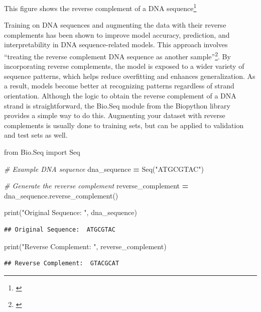 \documentclass[
]{book}
\newenvironment{Shaded}{\begin{snugshade}}{\end{snugshade}}
\newcommand{\BuiltInTok}[1]{#1}
\newcommand{\CommentTok}[1]{\textcolor[rgb]{0.56,0.35,0.01}{\textit{#1}}}
\newcommand{\ImportTok}[1]{#1}
\newcommand{\NormalTok}[1]{#1}
\newcommand{\OperatorTok}[1]{\textcolor[rgb]{0.81,0.36,0.00}{\textbf{#1}}}
\newcommand{\StringTok}[1]{\textcolor[rgb]{0.31,0.60,0.02}{#1}}
\begin{document}
This figure shows the reverse complement of a DNA sequence\footnote{\citet{clark2021}}

Training on DNA sequences and augmenting the data with their reverse complements has been shown to improve model accuracy, prediction, and interpretability in DNA sequence-related models. This approach involves ``treating the reverse complement DNA sequence as another sample''\footnote{\citet{cao2019}}. By incorporating reverse complements, the model is exposed to a wider variety of sequence patterns, which helps reduce overfitting and enhances generalization. As a result, models become better at recognizing patterns regardless of strand orientation. Although the logic to obtain the reverse complement of a DNA strand is straightforward, the Bio.Seq module from the Biopython library provides a simple way to do this. Augmenting your dataset with reverse complements is usually done to training sets, but can be applied to validation and test sets as well.

\begin{Shaded}
\begin{Highlighting}[]
\ImportTok{from}\NormalTok{ Bio.Seq }\ImportTok{import}\NormalTok{ Seq}

\CommentTok{\# Example DNA sequence}
\NormalTok{dna\_sequence }\OperatorTok{=}\NormalTok{ Seq(}\StringTok{"ATGCGTAC"}\NormalTok{)}

\CommentTok{\# Generate the reverse complement}
\NormalTok{reverse\_complement }\OperatorTok{=}\NormalTok{ dna\_sequence.reverse\_complement()}

\BuiltInTok{print}\NormalTok{(}\StringTok{"Original Sequence: "}\NormalTok{, dna\_sequence)}
\end{Highlighting}
\end{Shaded}

\begin{verbatim}
## Original Sequence:  ATGCGTAC
\end{verbatim}

\begin{Shaded}
\begin{Highlighting}[]
\BuiltInTok{print}\NormalTok{(}\StringTok{"Reverse Complement: "}\NormalTok{, reverse\_complement)}
\end{Highlighting}
\end{Shaded}

\begin{verbatim}
## Reverse Complement:  GTACGCAT
\end{verbatim}
\end{document}
